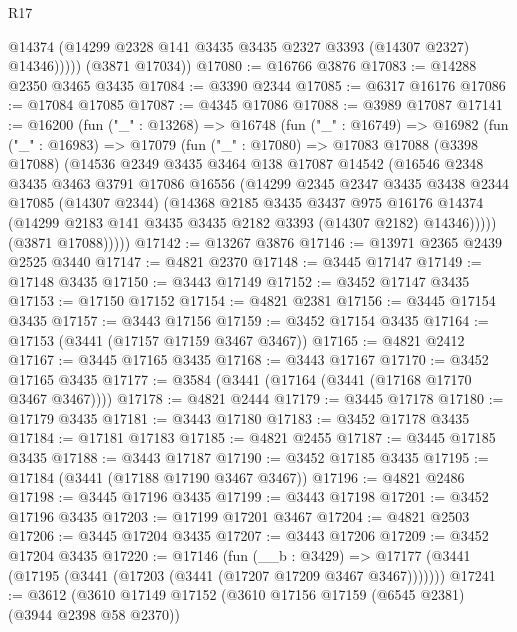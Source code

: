 \begin{lexlean}{R17}
\begin{coremodule}
              @14374
              (@14299 @2328 @141 @3435 @3435 @2327 @3393 (@14307 @2327) @14346)))))
      (@3871 @17034))
@17080 := @16766 @3876
@17083 := @14288 @2350 @3465 @3435
@17084 := @3390 @2344
@17085 := @6317 @16176
@17086 := @17084 @17085
@17087 := @4345 @17086
@17088 := @3989 @17087
@17141 := @16200
    (fun ("_" : @13268) =>
    @16748
      (fun ("_" : @16749) =>
      @16982
        (fun ("_" : @16983) =>
        @17079
          (fun ("_" : @17080) =>
          @17083
            @17088
            (@3398 @17088)
            (@14536
              @2349
              @3435
              @3464
              @138
              @17087
              @14542
              (@16546
                @2348
                @3435
                @3463
                @3791
                @17086
                @16556
                (@14299
                  @2345
                  @2347
                  @3435
                  @3438
                  @2344
                  @17085
                  (@14307 @2344)
                  (@14368
                    @2185
                    @3435
                    @3437
                    @975
                    @16176
                    @14374
                    (@14299 @2183 @141 @3435 @3435 @2182 @3393 (@14307 @2182) @14346)))))
            (@3871 @17088)))))
@17142 := @13267 @3876
@17146 := @13971 @2365 @2439 @2525 @3440
@17147 := @4821 @2370
@17148 := @3445 @17147
@17149 := @17148 @3435
@17150 := @3443 @17149
@17152 := @3452 @17147 @3435
@17153 := @17150 @17152
@17154 := @4821 @2381
@17156 := @3445 @17154 @3435
@17157 := @3443 @17156
@17159 := @3452 @17154 @3435
@17164 := @17153 (@3441 (@17157 @17159 @3467 @3467))
@17165 := @4821 @2412
@17167 := @3445 @17165 @3435
@17168 := @3443 @17167
@17170 := @3452 @17165 @3435
@17177 := @3584 (@3441 (@17164 (@3441 (@17168 @17170 @3467 @3467))))
@17178 := @4821 @2444
@17179 := @3445 @17178
@17180 := @17179 @3435
@17181 := @3443 @17180
@17183 := @3452 @17178 @3435
@17184 := @17181 @17183
@17185 := @4821 @2455
@17187 := @3445 @17185 @3435
@17188 := @3443 @17187
@17190 := @3452 @17185 @3435
@17195 := @17184 (@3441 (@17188 @17190 @3467 @3467))
@17196 := @4821 @2486
@17198 := @3445 @17196 @3435
@17199 := @3443 @17198
@17201 := @3452 @17196 @3435
@17203 := @17199 @17201 @3467
@17204 := @4821 @2503
@17206 := @3445 @17204 @3435
@17207 := @3443 @17206
@17209 := @3452 @17204 @3435
@17220 := @17146
    (fun (__b : @3429) =>
    @17177 (@3441 (@17195 (@3441 (@17203 (@3441 (@17207 @17209 @3467 @3467)))))))
@17241 := @3612
    (@3610
      @17149
      @17152
      (@3610 @17156 @17159 (@6545 @2381) (@3944 @2398 @58 @2370))

\end{coremodule}
\end{lexlean}
